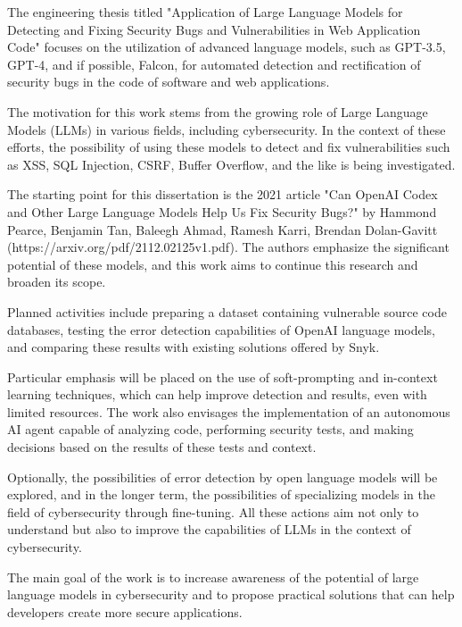 {}{
The engineering thesis titled "Application of Large Language Models for Detecting and Fixing Security Bugs and Vulnerabilities in Web Application Code" focuses on the utilization of advanced language models, such as GPT-3.5, GPT-4, and if possible, Falcon, for automated detection and rectification of security bugs in the code of software and web applications.

The motivation for this work stems from the growing role of Large Language Models (LLMs) in various fields, including cybersecurity. In the context of these efforts, the possibility of using these models to detect and fix vulnerabilities such as XSS, SQL Injection, CSRF, Buffer Overflow, and the like is being investigated.

The starting point for this dissertation is the 2021 article "Can OpenAI Codex and Other Large Language Models Help Us Fix Security Bugs?" by Hammond Pearce, Benjamin Tan, Baleegh Ahmad, Ramesh Karri, Brendan Dolan-Gavitt (https://arxiv.org/pdf/2112.02125v1.pdf). The authors emphasize the significant potential of these models, and this work aims to continue this research and broaden its scope.

Planned activities include preparing a dataset containing vulnerable source code databases, testing the error detection capabilities of OpenAI language models, and comparing these results with existing solutions offered by Snyk.

Particular emphasis will be placed on the use of soft-prompting and in-context learning techniques, which can help improve detection and results, even with limited resources. The work also envisages the implementation of an autonomous AI agent capable of analyzing code, performing security tests, and making decisions based on the results of these tests and context.

Optionally, the possibilities of error detection by open language models will be explored, and in the longer term, the possibilities of specializing models in the field of cybersecurity through fine-tuning. All these actions aim not only to understand but also to improve the capabilities of LLMs in the context of cybersecurity.

The main goal of the work is to increase awareness of the potential of large language models in cybersecurity and to propose practical solutions that can help developers create more secure applications.



}